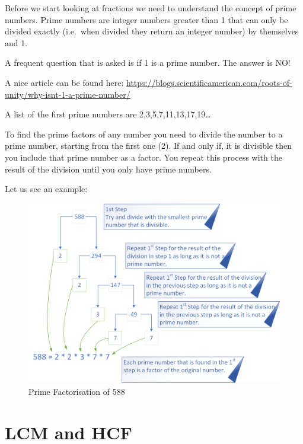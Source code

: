 \documentclass[
]{book}
\begin{document}
Before we start looking at fractions we need to understand the concept of prime numbers. Prime numbers are integer numbers greater than 1 that can only be divided exactly (i.e.~when divided they return an integer number) by themselves and 1.

A frequent question that is asked is if 1 is a prime number. The answer is NO!

A nice article can be found here:
\url{https://blogs.scientificamerican.com/roots-of-unity/why-isnt-1-a-prime-number/}

A list of the first prime numbers are 2,3,5,7,11,13,17,19\ldots{}

To find the prime factors of any number you need to divide the number to a prime number, starting from the first one (2). If and only if, it is divisible then you include that prime number as a factor. You repeat this process with the result of the division until you only have prime numbers.

Let us see an example:

\begin{figure}

{\centering \includegraphics[width=1\linewidth]{images/factorisation_1} 

}

\caption{Prime Factorisation of 588}\label{fig:unnamed-chunk-6}
\end{figure}

\hypertarget{lcm-and-hcf}{%
\section{LCM and HCF}\label{lcm-and-hcf}}
\end{document}
